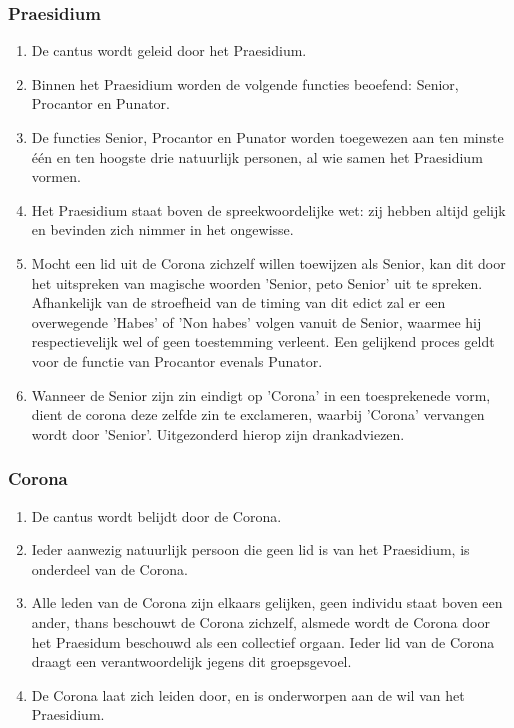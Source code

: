 \subsubsection*{Praesidium}
\footnotesize

\begin{enumerate}
    \item De cantus wordt geleid door het Praesidium.
    \item Binnen het Praesidium worden de volgende functies beoefend: Senior, Procantor en Punator.
    \item De functies Senior, Procantor en Punator worden toegewezen aan ten minste één en ten hoogste drie natuurlijk personen, al wie samen het Praesidium vormen.
    \item Het Praesidium staat boven de spreekwoordelijke wet: zij hebben altijd gelijk en bevinden zich nimmer in het ongewisse. 
    \item Mocht een lid uit de Corona zichzelf willen toewijzen als Senior, kan dit door het uitspreken van magische woorden 'Senior, peto Senior' uit te spreken. Afhankelijk van de stroefheid van de timing van dit edict zal er een overwegende 'Habes' of 'Non habes' volgen vanuit de Senior, waarmee hij respectievelijk wel of geen toestemming verleent. Een gelijkend proces geldt voor de functie van Procantor evenals Punator. 
    \item Wanneer de Senior zijn zin eindigt op 'Corona' in een toesprekenede vorm, dient de corona deze zelfde zin te exclameren, waarbij 'Corona' vervangen wordt door 'Senior'. Uitgezonderd hierop zijn drankadviezen.
\end{enumerate}

\subsubsection*{Corona}
\begin{enumerate}
    \item De cantus wordt belijdt door de Corona.
    \item Ieder aanwezig natuurlijk persoon die geen lid is van het Praesidium, is onderdeel van de Corona. 
    \item Alle leden van de Corona zijn elkaars gelijken, geen individu staat boven een ander, thans beschouwt de Corona zichzelf, alsmede wordt de Corona door het Praesidum beschouwd als een collectief orgaan. Ieder lid van de Corona draagt een verantwoordelijk jegens dit groepsgevoel.
    \item De Corona laat zich leiden door, en is onderworpen aan de wil van het Praesidium.
\end{enumerate}

